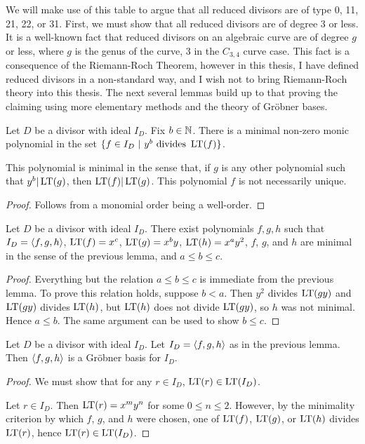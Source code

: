We will make use of this table to argue that all reduced divisors are of type 0, 11, 21, 22, or 31.
First, we must show that all reduced divisors are of degree 3 or less.
It is a well-known fact that reduced divisors on an algebraic curve are of degree $g$ or less,
where $g$ is the genus of the curve, 3 in the $C_{3,4}$ curve case.
This fact is a consequence of the Riemann-Roch Theorem,
however in this thesis, I have defined reduced divisors in a non-standard way,
and I wish not to bring Riemann-Roch theory into this thesis.
The next several lemmas build up to that proving the claiming using more elementary methods
and the theory of Gr\"obner bases.

\begin{lemma}
  Let $D$ be a divisor with ideal $I_D$.
  Fix $b \in \mathbb{N}$.
  There is a minimal non-zero monic polynomial in the set $\{ f \in I_D ~|~ y^b \text{ divides } \operatorname{LT}(f)\}$.
\end{lemma}
This polynomial is minimal in the sense that, if $g$ is any other polynomial such that $y^b|\operatorname{LT}(g)$,
then $\operatorname{LT}(f)|\operatorname{LT}(g)$.
This polynomial $f$ is not necessarily unique.
\begin{proof}
  Follows from a monomial order being a well-order.
\end{proof}

\begin{lemma}
  Let $D$ be a divisor with ideal $I_D$.
  There exist polynomials $f, g, h$ such that $I_D = \left\langle f, g, h \right\rangle$,
  $\operatorname{LT}(f) = x^c$,
  $\operatorname{LT}(g) = x^by$,
  $\operatorname{LT}(h) = x^ay^2$,
  $f$, $g$, and $h$ are minimal in the sense of the previous lemma,
  and $a \leq b \leq c$.
\end{lemma}
\begin{proof}
  Everything but the relation $a \leq b \leq c$ is immediate from the previous lemma.
  To prove this relation holds, suppose $b < a$.
  Then $y^2$ divides $\operatorname{LT}(gy)$ and $\operatorname{LT}(gy)$ divides $\operatorname{LT}(h)$, but $\operatorname{LT}(h)$ does not divide $\operatorname{LT}(gy)$,
  so $h$ was not minimal. Hence $a \leq b$.
  The same argument can be used to show $b \leq c$.
\end{proof}

\begin{lemma}
  Let $D$ be a divisor with ideal $I_D$.
  Let $I_D = \left\langle f, g, h \right\rangle$ as in the previous lemma.
  Then $\left\langle f, g, h \right\rangle$ is a Gr\"obner basis for $I_D$.
\end{lemma}
\begin{proof}
  We must show that for any $r \in I_D$, $\operatorname{LT}(r) \in \operatorname{LT}(I_D)$.
  
  Let $r \in I_D$. Then $\operatorname{LT}(r) = x^my^n$ for some $0 \leq n \leq 2$.
  However, by the minimality criterion by which $f$, $g$, and $h$ were chosen,
  one of $\operatorname{LT}(f)$, $\operatorname{LT}(g)$, or $\operatorname{LT}(h)$ divides $\operatorname{LT}(r)$, hence $\operatorname{LT}(r) \in \operatorname{LT}(I_D)$.
\end{proof}

